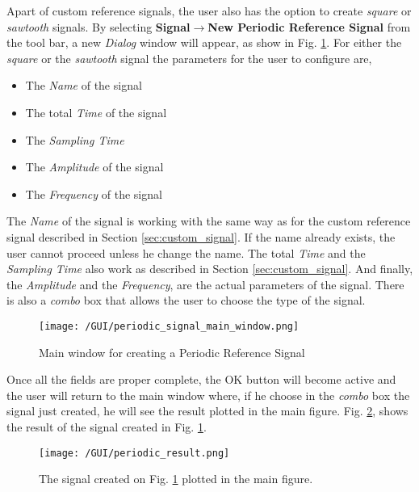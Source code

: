 Apart of custom reference signals, the user also has the option to create \textit{square} or \textit{sawtooth} signals. By selecting \textbf{Signal}$\rightarrow$\textbf{New Periodic Reference Signal} from the tool bar, a new \textit{Dialog} window will appear, as show in Fig. \ref{fig:periodic_main}. For either the \textit{square} or the \textit{sawtooth} signal the parameters for the user to configure are,

\begin{itemize}
	\item The \textit{Name} of the signal
	\item The total \textit{Time} of the signal
	\item The \textit{Sampling Time}
	\item The \textit{Amplitude} of the signal
	\item The \textit{Frequency} of the signal
\end{itemize}

The \textit{Name} of the signal is working with the same way as for the custom reference signal described in Section \ref{sec:custom_signal}. If the name already exists, the user cannot proceed unless he change the name. The total \textit{Time} and the \textit{Sampling Time} also work as described in Section \ref{sec:custom_signal}. And finally, the \textit{Amplitude} and the \textit{Frequency}, are the actual parameters of the signal. There is also a \textit{combo} box that allows the user to choose the type of the signal.

\begin{figure}[h!]
\centering
	\texttt{[image: /GUI/periodic\_signal\_main\_window.png]}
	\caption{Main window for creating a Periodic Reference Signal}
	\label{fig:periodic_main}
\end{figure}

Once all the fields are proper complete, the OK button will become active and the user will return to the main window where, if he choose in the \textit{combo} box the signal just created, he will see the result plotted in the main figure. Fig. \ref{fig:periodic_result}, shows the result of the signal created in Fig. \ref{fig:periodic_main}.

\begin{figure}[h!]
\centering
	\texttt{[image: /GUI/periodic\_result.png]}
	\caption{The signal created on Fig. \ref{fig:periodic_main} plotted in the main figure.}
	\label{fig:periodic_result}
\end{figure}

